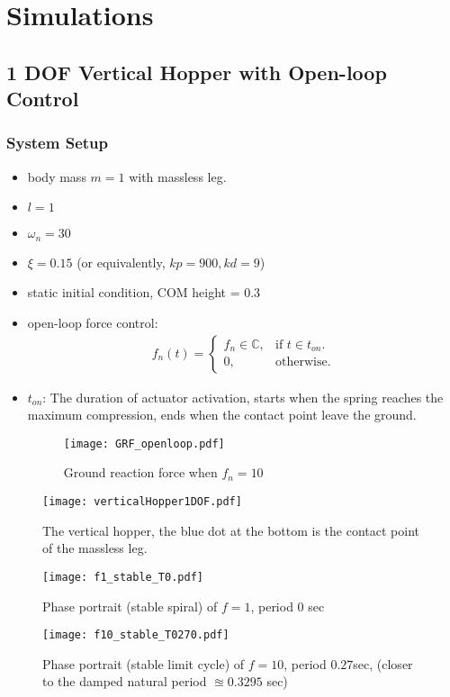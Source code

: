 \section{Simulations}
\subsection{1 DOF Vertical Hopper with Open-loop Control\cite{Cham2002}}
\subsubsection*{System Setup}
\begin{itemize}
\item body mass $m=1$ with massless leg.
\item $l=1$
\item $\omega_n = 30$
\item $\xi = 0.15$ (or equivalently, $kp = 900, kd = 9$)
\item static initial condition, COM height = 0.3
\item open-loop force control:
\begin{align*}
 f_n(t)=\begin{cases}
    f_n\in \mathbb{C}, & \text{if $t \in t_{on}$}.\\
    0, & \text{otherwise}.
  \end{cases}
\end{align*}
  \item $t_{on}$: The duration of actuator activation, starts when the spring reaches the maximum compression, ends when the contact point leave the ground.
  \begin{figure}[H]
  \centering
  \texttt{[image: GRF\_openloop.pdf]} 
  \caption{Ground reaction force when $f_n = 10$}
  \end{figure}
  
\end{itemize}
\begin{figure}[H]
\centering
\texttt{[image: verticalHopper1DOF.pdf]} 
\caption{The vertical hopper, the blue dot at the bottom is the contact point of the massless leg.}
\label{fig.verticalHopper1DOF}
\end{figure}

\begin{figure}[H] 
\centering
\texttt{[image: f1\_stable\_T0.pdf]} 
\caption{Phase portrait (stable spiral) of $f = 1$, period $0$ sec}
\end{figure}
\begin{figure}[H] 
\centering
\texttt{[image: f10\_stable\_T0270.pdf]} 
\caption{Phase portrait (stable limit cycle) of $f = 10$, period $0.27$sec, (closer to the damped natural period $\approxeq 0.3295$ sec)}
\end{figure}

